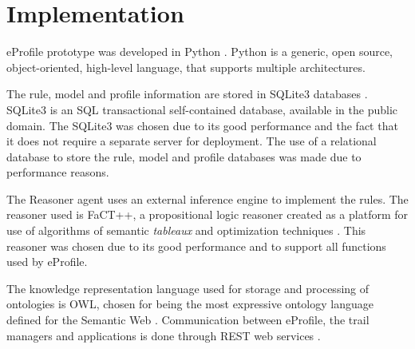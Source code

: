 \documentclass[preprint,authoryear,12pt,dvipdfm]{elsarticle}
\begin{document}
\section{Implementation}
\label{ch:implementacao}

eProfile prototype was developed in Python \citep{python}. Python is a generic, open source, object-oriented, high-level language, that supports multiple architectures. %


The rule, model and profile information are stored in SQLite3 databases \citep{sqlite3}. SQLite3 is an SQL transactional self-contained database, available in the public domain. The SQLite3 was chosen due to its good performance and the fact that it does not require a separate server for deployment. The use of a relational database to store the rule, model and profile databases was made due to performance reasons.

The Reasoner agent uses an external inference engine to implement the rules. The reasoner used is FaCT++, a propositional logic reasoner created as a platform for use of algorithms of semantic {\em tableaux} and optimization techniques \citep{tsarkov06}. This reasoner was chosen due to its good performance and to support all functions used by eProfile. %

The knowledge representation language used for storage and processing of ontologies is OWL\citep {owl-guide}, chosen for being the most expressive ontology language defined for the Semantic Web \citep{daconta03}. Communication between eProfile, the trail managers and applications is done through REST web services \citep{fielding00}. %

\end{document}
